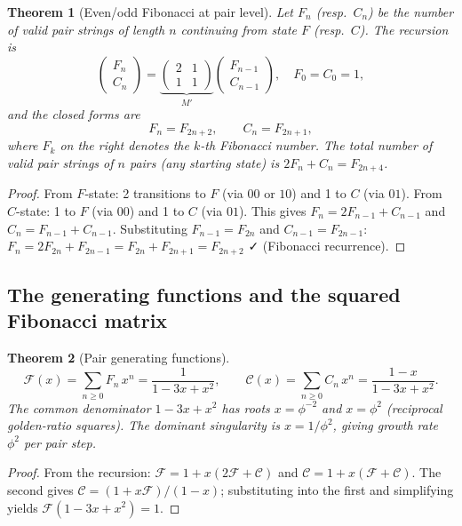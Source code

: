 \documentclass[12pt,reqno]{amsart}
\newtheorem{theorem}{Theorem}[section]
\theoremstyle{definition}
\theoremstyle{plain}
\begin{document}
\begin{theorem}[Even/odd Fibonacci at pair level]\label{thm:pair-fib}
Let $F_n$ (resp.\ $C_n$) be the number of valid pair strings of length $n$
continuing from state $F$ (resp.\ $C$).  The recursion is
\[
  \begin{pmatrix}F_n\\C_n\end{pmatrix}
  =\underbrace{\begin{pmatrix}2&1\\1&1\end{pmatrix}}_{M'}\begin{pmatrix}F_{n-1}\\C_{n-1}\end{pmatrix},
  \quad F_0=C_0=1,
\]
and the closed forms are
\[
  F_n=F_{2n+2},\qquad C_n=F_{2n+1},
\]
where $F_k$ on the right denotes the $k$-th Fibonacci number.  The total
number of valid pair strings of $n$ pairs (any starting state) is
$2F_n+C_n=F_{2n+4}$.
\end{theorem}

\begin{proof}
From $F$-state: 2 transitions to $F$ (via $00$ or $10$) and 1 to $C$ (via $01$).
From $C$-state: 1 to $F$ (via $00$) and 1 to $C$ (via $01$).
This gives $F_n=2F_{n-1}+C_{n-1}$ and $C_n=F_{n-1}+C_{n-1}$.
Substituting $F_{n-1}=F_{2n}$ and $C_{n-1}=F_{2n-1}$:
$F_n=2F_{2n}+F_{2n-1}=F_{2n}+F_{2n+1}=F_{2n+2}$ ✓ (Fibonacci recurrence).
\end{proof}

\subsection{The generating functions and the squared Fibonacci matrix}
\label{ssec:pair-gf}

\begin{theorem}[Pair generating functions]\label{thm:pair-gf}
\[
  \mathcal{F}(x)=\sum_{n\ge0}F_n\,x^n=\frac{1}{1-3x+x^2},\qquad
  \mathcal{C}(x)=\sum_{n\ge0}C_n\,x^n=\frac{1-x}{1-3x+x^2}.
\]
The common denominator $1-3x+x^2$ has roots $x=\phi^{-2}$ and $x=\phi^2$
(reciprocal golden-ratio squares).  The dominant singularity is
$x=1/\phi^2$, giving growth rate $\phi^2$ per pair step.
\end{theorem}

\begin{proof}
From the recursion: $\mathcal{F}=1+x(2\mathcal{F}+\mathcal{C})$ and
$\mathcal{C}=1+x(\mathcal{F}+\mathcal{C})$.  The second gives
$\mathcal{C}=(1+x\mathcal{F})/(1-x)$; substituting into the first and
simplifying yields $\mathcal{F}(1-3x+x^2)=1$.
\end{proof}
\end{document}
